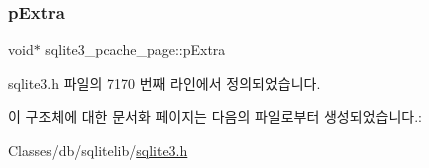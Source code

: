 \subsubsection{\texorpdfstring{p\+Extra}{pExtra}}
{\footnotesize\ttfamily void$\ast$ sqlite3\+\_\+pcache\+\_\+page\+::p\+Extra}



sqlite3.\+h 파일의 7170 번째 라인에서 정의되었습니다.



이 구조체에 대한 문서화 페이지는 다음의 파일로부터 생성되었습니다.\+:\begin{DoxyCompactItemize}
\item 
Classes/db/sqlitelib/\hyperlink{sqlite3_8h}{sqlite3.\+h}\end{DoxyCompactItemize}
